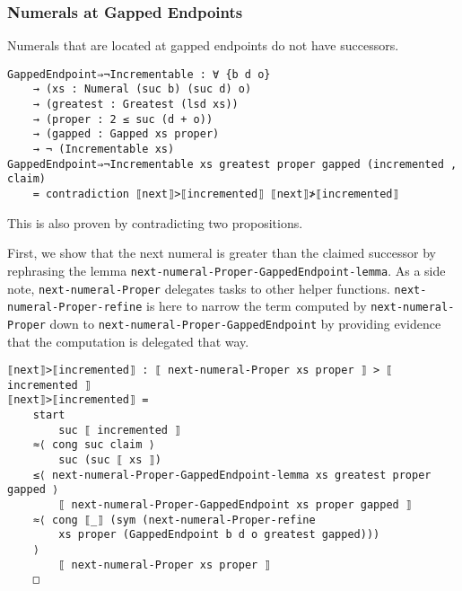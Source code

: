 \documentclass[\main/thesis.tex]{subfiles}
\begin{document}
\subsubsection{Numerals at Gapped Endpoints}

Numerals that are located at gapped endpoints do not have successors.

\begin{center}
    \begin{adjustbox}{max width=\textwidth}
    \end{adjustbox}
\end{center}

\begin{lstlisting}[basicstyle=\ttfamily\scriptsize]
GappedEndpoint⇒¬Incrementable : ∀ {b d o}
    → (xs : Numeral (suc b) (suc d) o)
    → (greatest : Greatest (lsd xs))
    → (proper : 2 ≤ suc (d + o))
    → (gapped : Gapped xs proper)
    → ¬ (Incrementable xs)
GappedEndpoint⇒¬Incrementable xs greatest proper gapped (incremented , claim)
    = contradiction ⟦next⟧>⟦incremented⟧ ⟦next⟧≯⟦incremented⟧
\end{lstlisting}

This is also proven by contradicting two propositions.

First, we show that the next numeral is greater than the claimed successor
by rephrasing the lemma \lstinline|next-numeral-Proper-GappedEndpoint-lemma|.
As a side note, \lstinline|next-numeral-Proper| delegates tasks to other helper
functions. \lstinline|next-numeral-Proper-refine| is here to narrow the term
computed by \lstinline|next-numeral-Proper| down to
\lstinline|next-numeral-Proper-GappedEndpoint|
by providing evidence that the computation is delegated that way.

\begin{lstlisting}[basicstyle=\ttfamily\scriptsize]
⟦next⟧>⟦incremented⟧ : ⟦ next-numeral-Proper xs proper ⟧ > ⟦ incremented ⟧
⟦next⟧>⟦incremented⟧ =
    start
        suc ⟦ incremented ⟧
    ≈⟨ cong suc claim ⟩
        suc (suc ⟦ xs ⟧)
    ≤⟨ next-numeral-Proper-GappedEndpoint-lemma xs greatest proper gapped ⟩
        ⟦ next-numeral-Proper-GappedEndpoint xs proper gapped ⟧
    ≈⟨ cong ⟦_⟧ (sym (next-numeral-Proper-refine
        xs proper (GappedEndpoint b d o greatest gapped)))
    ⟩
        ⟦ next-numeral-Proper xs proper ⟧
    □
\end{lstlisting}
\end{document}
